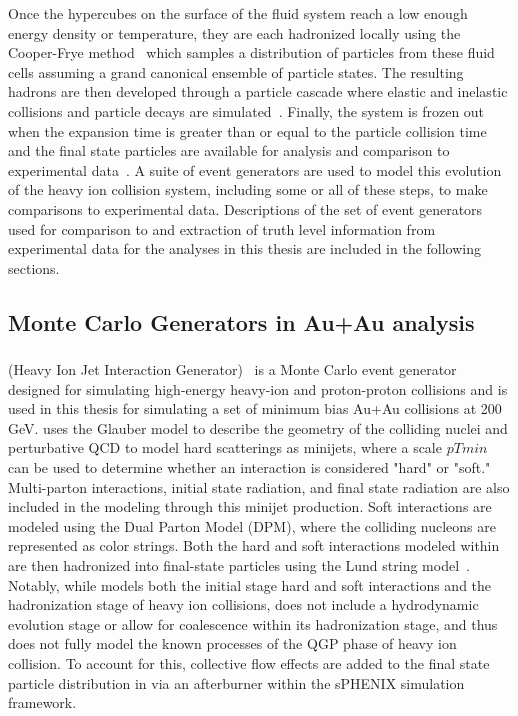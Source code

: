 Once the hypercubes on the surface of the fluid system reach a low enough energy density or temperature, they are each hadronized locally using the Cooper-Frye method~\cite{cooper_frye_1974} which samples a distribution of particles from these fluid cells assuming a grand canonical ensemble of particle states.
The resulting hadrons are then developed through a particle cascade where elastic and inelastic collisions and particle decays are simulated~\cite{urqmd_Bass:1998ca,urqmd_Bleicher:1999xi,SMASH:2016zqf}.
Finally, the system is frozen out when the expansion time is greater than or equal to the particle collision time and the final state particles are available for analysis and comparison to experimental data~\cite{kinetic_freezeout}.
A suite of event generators are used to model this evolution of the heavy ion collision system, including some or all of these steps, to make comparisons to experimental data.
Descriptions of the set of event generators used for comparison to and extraction of truth level information from experimental data for the analyses in this thesis are included in the following sections.

\subsection{Monte Carlo Generators in Au+Au analysis}
\subsubsection{\hijing}
\hijing (Heavy Ion Jet Interaction Generator)~\cite{hijing} is a Monte Carlo event generator designed for simulating high-energy heavy-ion and proton-proton collisions and is used in this thesis for simulating a set of minimum bias Au+Au collisions at 200 GeV. 
\hijing uses the Glauber model to describe the geometry of the colliding nuclei and perturbative QCD to model hard scatterings as minijets, where a scale $pTmin$ can be used to determine whether an interaction is considered "hard" or "soft."
Multi-parton interactions, initial state radiation, and final state radiation are also included in the modeling through this minijet production.
Soft interactions are modeled using the Dual Parton Model (DPM), where the colliding nucleons are represented as color strings.
Both the hard and soft interactions modeled within \hijing are then hadronized into final-state particles using the Lund string model~\cite{lund_frag_model,lund_frag_model_sjostrand}.
Notably, while \hijing models both the initial stage hard and soft interactions and the hadronization stage of heavy ion collisions, \hijing does not include a hydrodynamic evolution stage or allow for coalescence within its hadronization stage, and thus does not fully model the known processes of the QGP phase of heavy ion collision.
To account for this, collective flow effects are added to the final state particle distribution in \hijing via an afterburner within the sPHENIX \geant simulation framework.

